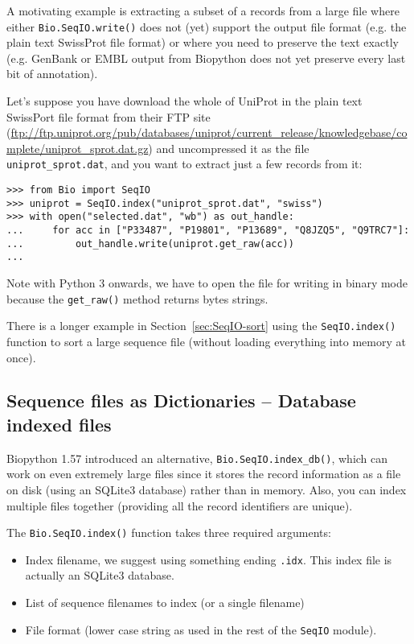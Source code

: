 A motivating example is extracting a subset of a records from a large
file where either \verb|Bio.SeqIO.write()| does not (yet) support the
output file format (e.g. the plain text SwissProt file format) or
where you need to preserve the text exactly (e.g. GenBank or EMBL
output from Biopython does not yet preserve every last bit of
annotation).

Let's suppose you have download the whole of UniProt in the plain
text SwissPort file format from their FTP site
(\url{ftp://ftp.uniprot.org/pub/databases/uniprot/current_release/knowledgebase/complete/uniprot_sprot.dat.gz})
and uncompressed it as the file \verb|uniprot_sprot.dat|, and you
want to extract just a few records from it:

\begin{verbatim}
>>> from Bio import SeqIO
>>> uniprot = SeqIO.index("uniprot_sprot.dat", "swiss")
>>> with open("selected.dat", "wb") as out_handle:
...     for acc in ["P33487", "P19801", "P13689", "Q8JZQ5", "Q9TRC7"]:
...         out_handle.write(uniprot.get_raw(acc))
...
\end{verbatim}

Note with Python 3 onwards, we have to open the file for writing in
binary mode because the \verb|get_raw()| method returns bytes strings.

There is a longer example in Section~\ref{sec:SeqIO-sort} using the
\verb|SeqIO.index()| function to sort a large sequence file (without
loading everything into memory at once).

\subsection{Sequence files as Dictionaries -- Database indexed files}
\label{sec:SeqIO-index-db}

Biopython 1.57 introduced an alternative, \verb|Bio.SeqIO.index_db()|, which
can work on even extremely large files since it stores the record information
as a file on disk (using an SQLite3 database) rather than in memory. Also,
you can index multiple files together (providing all the record identifiers
are unique).

The \verb|Bio.SeqIO.index()| function takes three required arguments:
\begin{itemize}
\item Index filename, we suggest using something ending \texttt{.idx}.
This index file is actually an SQLite3 database.
\item List of sequence filenames to index (or a single filename)
\item File format (lower case string as used in the rest of the
\verb|SeqIO| module).
\end{itemize}


